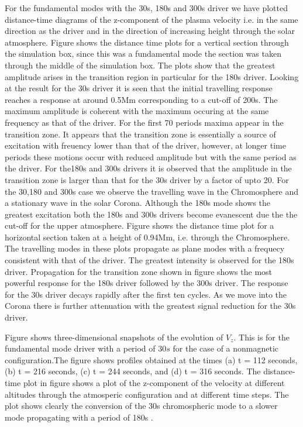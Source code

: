 \documentclass{aa}
\begin{document}
For the fundamental modes with the 30s, 180s and 300s driver we have plotted distance-time diagrams of the z-component of the plasma velocity i.e. in the same direction as the driver and in the direction of increasing height through the solar atmosphere.  Figure  shows the distance time plots for a vertical section through the simulation box, since this was a fundamental mode the section was taken through the middle of the simulation box. The plots show that the greatest amplitude arises in the transition region in particular for the 180s driver. Looking at the result for the 30s driver it is seen that the initial travelling response reaches a response at around 0.5Mm corresponding to a cut-off of 200s. The maximum amplitude is coherent with the maximum occuring at the same frequency as that of the driver. For the first 70 periods maxima appear in the transition zone. It appears that the transition zone is essentially a source of excitation with freuency lower than that of the driver, however, at longer time periods these motions occur with reduced amplitude but with the same period as the driver. For the180s and 300s drivers it is observed that the amplitude in the transition zone is larger than that for the 30s driver by a factor of upto 20. For the 30,180 and 300s case we observe the travelling wave in the Chromosphere and a stationary wave in the solar Corona. Although the 180s mode shows the greatest excitation both the 180s and 300s drivers become evanescent due the the cut-off for the upper atmosphere. Figure  shows the distance time plot for a horizontal section taken at a height of 0.94Mm, i.e. through the Chromosphere. The travelling modes in these plots propagate as plane modes with a frequecy consistent with that of the driver. The greatest intensity is observed for the 180s driver. Propagation for the transition zone shown in figure  shows the most powerful response for the 180s driver followed by the 300s driver. The response for the 30s driver decays rapidly after the first ten cycles. As we move into the Corona there is further attenuation with the greatest signal reduction for the 30s driver.



Figure %
 shows three-dimensional snapshots of the evolution of $V_{z}$. This is for the fundamental mode driver with a period of $30s$ for the case of a nonmagnetic configuration.The figure shows profiles obtained at the times (a) t = 112 seconds, (b) t = 216 seconds, (c) t = 244 seconds, and (d) t = 316 seconds. The distance-time plot in figure  shows a plot of the z-component of the velocity at different altitudes through the atmosperic configuration and at different time steps. The plot shows clearly the conversion of the 30s chromospheric mode to a slower mode propagating with a period of 180s \cite{Leibacher1982}. 
\end{document}
